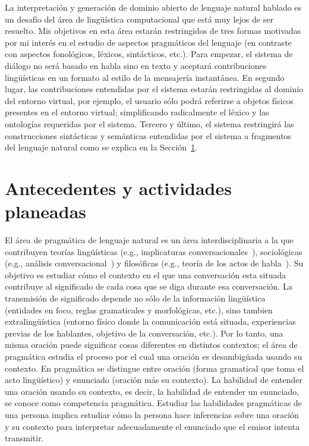 \documentclass[11pt]{article}
\begin{document}
La interpretaci\'on y generaci\'on de dominio abierto de lenguaje natural
hablado es un desaf\'io del \'area de ling\"u\'istica computacional que est\'a
muy lejos de ser resuelto. Mis objetivos en esta \'area estar\'an
restringidos de tres formas motivadas por mi inter\'es en el estudio de
aspectos pragm\'aticos del lenguaje (en contraste con aspectos fonol\'ogicos,
l\'exicos, sint\'acticos, etc.). Para empezar, el sistema de di\'alogo no
ser\'a basado en habla sino en texto y aceptar\'a contribuciones
ling\"u\'isticas en un formato al estilo de la mensajer\'ia instant\'anea.
En segundo lugar, las contribuciones entendidas por el sistema estar\'an
restringidas al dominio del entorno virtual, por ejemplo, el usuario s\'olo
podr\'a referirse a objetos f\'isicos presentes en el entorno virtual; 
simplificando radicalmente el l\'exico y las ontolog\'ias requeridas por el
sistema. Tercero y \'ultimo, el sistema restringir\'a las
construcciones sint\'acticas y sem\'anticas entendidas por el sistema a
fragmentos del lenguaje natural como se explica en la
Secci\'on~\ref{antecedentes}.


\section{Antecedentes y actividades planeadas} \label{antecedentes}

El \'area de pragm\'atica de lenguaje natural es un \'area
interdisciplinaria a
la que contribuyen teor\'ias ling\"u\'isticas (e.g., implicaturas
conversacionales~\citep{grice75}), sociol\'ogicas (e.g., an\'alisis
conversa\-cio\-nal~\citep{schegloff87b}) y filos\'oficas (e.g., teor\'ia de los
actos de habla~\citep{austin62}). Su objetivo es estudiar c\'omo el contexto en
el que una conversaci\'on esta situada contribuye al significado de cada cosa
que se diga durante esa conversaci\'on. La transmisi\'on de significado depende
no s\'olo de la informaci\'on ling\"u\'istica (entidades en foco, reglas
gramaticales y morfol\'ogicas, etc.), sino tambien extraling\"u\'istica
(entorno f\'isico donde la comunicaci\'on est\'a situada, experiencias
previas de los hablantes, objetivo de la conversaci\'on, etc.). Por lo tanto,
una misma oraci\'on puede significar cosas diferentes en distintos contextos; el
\'area de pragm\'atica estudia el proceso por el cual una oraci\'on es
desambig\"uada usando su contexto. En pragm\'atica se distingue entre oraci\'on
(forma gramatical que toma el acto ling\"u\'istico) y enunciado (oraci\'on m\'as
su contexto). La habilidad de entender una oraci\'on usando su contexto, es
decir, la habilidad de entender un enunciado, se conoce como competencia
pragm\'atica.
Estudiar las habilidades pragm\'aticas de una persona implica estudiar c\'omo
la persona hace
inferencias sobre una oraci\'on y su contexto para interpretar adecuadamente el
enunciado que el emisor intenta transmitir. 
\end{document}
